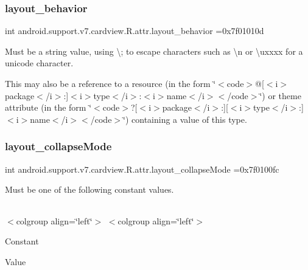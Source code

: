 \subsubsection{\texorpdfstring{layout\+\_\+behavior}{layout\_behavior}}
{\footnotesize\ttfamily int android.\+support.\+v7.\+cardview.\+R.\+attr.\+layout\+\_\+behavior =0x7f01010d\hspace{0.3cm}{\ttfamily [static]}}

Must be a string value, using \textquotesingle{}\textbackslash{};\textquotesingle{} to escape characters such as \textquotesingle{}\textbackslash{}n\textquotesingle{} or \textquotesingle{}\textbackslash{}uxxxx\textquotesingle{} for a unicode character. 

This may also be a reference to a resource (in the form \char`\"{}$<$code$>$@\mbox{[}$<$i$>$package$<$/i$>$\+:\mbox{]}$<$i$>$type$<$/i$>$\+:$<$i$>$name$<$/i$>$$<$/code$>$\char`\"{}) or theme attribute (in the form \char`\"{}$<$code$>$?\mbox{[}$<$i$>$package$<$/i$>$\+:\mbox{]}\mbox{[}$<$i$>$type$<$/i$>$\+:\mbox{]}$<$i$>$name$<$/i$>$$<$/code$>$\char`\"{}) containing a value of this type. \mbox{\label{classandroid_1_1support_1_1v7_1_1cardview_1_1R_1_1attr_ad533ba0bfa6adac0af8c0f41f719edef}} 
\subsubsection{\texorpdfstring{layout\+\_\+collapse\+Mode}{layout\_collapseMode}}
{\footnotesize\ttfamily int android.\+support.\+v7.\+cardview.\+R.\+attr.\+layout\+\_\+collapse\+Mode =0x7f0100fc\hspace{0.3cm}{\ttfamily [static]}}

Must be one of the following constant values.

\tabulinesep=1mm
\begin{longtabu} spread 0pt [c]{*{0}{|X[-1]}|}
\hline
\end{longtabu}
$<$colgroup align=\char`\"{}left\char`\"{}$>$ $<$colgroup align=\char`\"{}left\char`\"{}$>$ 

Constant

Value

